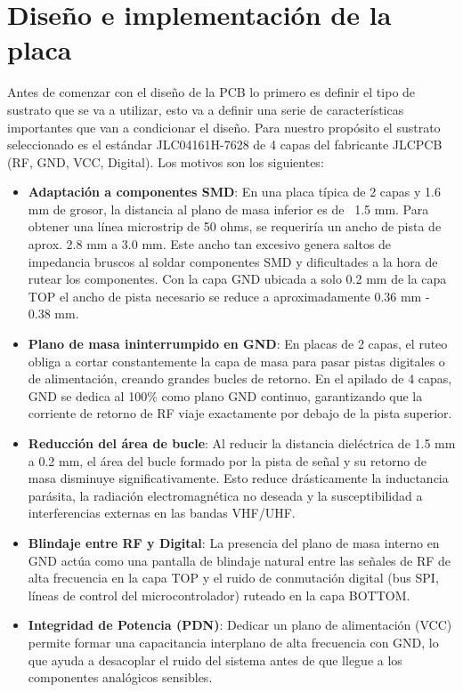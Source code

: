 \documentclass[11pt,a4paper,twoside]{report}
\begin{document}
	
	
	
	
	\chapter{Diseño e implementación de la placa}
	Antes de comenzar con el diseño de la PCB lo primero es definir el tipo de sustrato que se va a utilizar, esto va a definir una serie de características importantes que van a condicionar el diseño. Para nuestro propósito el sustrato seleccionado es el estándar JLC04161H-7628 de 4 capas del fabricante JLCPCB (RF, GND, VCC, Digital). Los motivos son los siguientes:
	\begin{itemize}
		\item 	\textbf{Adaptación a componentes SMD}: En una placa típica  de 2 capas y 1.6 mm de grosor, la distancia al plano de masa inferior es de ~1.5 mm. Para obtener una línea microstrip de 50 ohms, se requeriría un ancho de pista de aprox. 2.8 mm a 3.0 mm. Este ancho tan excesivo genera saltos de impedancia bruscos al soldar componentes SMD y dificultades a la hora de rutear los componentes. Con la capa GND ubicada a solo 0.2 mm de la capa TOP el ancho de pista necesario se reduce a aproximadamente 0.36 mm - 0.38 mm.
		
		\item \textbf{Plano de masa ininterrumpido en GND}: En placas de 2 capas, el ruteo obliga a cortar constantemente la capa de masa para pasar pistas digitales o de alimentación, creando grandes bucles de retorno. En el apilado de 4 capas, GND se dedica al 100\% como plano GND continuo, garantizando que la corriente de retorno de RF viaje exactamente por debajo de la pista superior.
		
		\item \textbf{Reducción del área de bucle}: Al reducir la distancia dieléctrica de 1.5 mm a 0.2 mm, el área del bucle formado por la pista de señal y su retorno de masa disminuye significativamente. Esto reduce drásticamente la inductancia parásita, la radiación electromagnética no deseada y la susceptibilidad a interferencias externas en las bandas VHF/UHF.
		
		\item \textbf{Blindaje entre RF y Digital}: La presencia del plano de masa interno en GND actúa como una pantalla de blindaje natural entre las señales de RF de alta frecuencia en la capa TOP y el ruido de conmutación digital (bus SPI, líneas de control del microcontrolador) ruteado en la capa BOTTOM.
		
		\item \textbf{Integridad de Potencia (PDN)}: Dedicar un plano de alimentación (VCC) permite formar una capacitancia interplano de alta frecuencia con GND, lo que ayuda a desacoplar el ruido del sistema antes de que llegue a los componentes analógicos sensibles.
	\end{itemize}\newpage
	 
\end{document}
